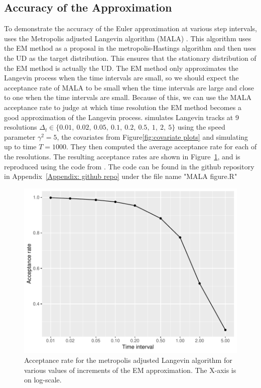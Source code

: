 \subsection{Accuracy of the Approximation}
To demonstrate the accuracy of the Euler approximation at various step intervals, \parencite{michelot_langevin_2019} uses the Metropolis adjusted Langevin algorithm (MALA) \parencite{roberts_exponential_1996}. This algorithm uses the EM method as a proposal in the metropolis-Hastings algorithm and then uses the UD as the target distribution. This ensures that the stationary distribution of the EM method is actually the UD. The EM method only approximates the Langevin process when the time intervals are small, so we should expect the acceptance rate of MALA to be small when the time intervals are large and close to one when the time intervals are small. Because of this, we can use the MALA acceptance rate to judge at which time resolution the EM method becomes a good approximation of the Langevin process. \parencite{michelot_langevin_2019} simulates Langevin tracks at 9 resolutions $\Delta_t\in \{ 0.01, \ 0.02, \ 0.05, \ 0.1, \ 0.2, \ 0.5, \ 1, \ 2, \ 5 \}$ using the speed parameter $\gamma^2 = 5$, the covariates from Figure\ref{fig:covariate plots} and simulating up to time $T=1000$. They then computed the average acceptance rate for each of the resolutions. The resulting acceptance rates are shown in Figure~\ref{fig:MALA}, and is reproduced using the code from \parencite{michelot_langevin_2019}. The code can be found in the github repository in Appendix~\ref{Appendix: github repo} under the file name "MALA figure.R"

\begin{figure}[H]
    \centering
    \includegraphics[width=\linewidth]{Images/background/MALArates.pdf}
    \caption[MALA acceptance rates]{Acceptance rate for the metropolis adjusted Langevin algorithm for various values of increments of the EM approximation. The X-axis is on log-scale.}
    \label{fig:MALA}
\end{figure}


